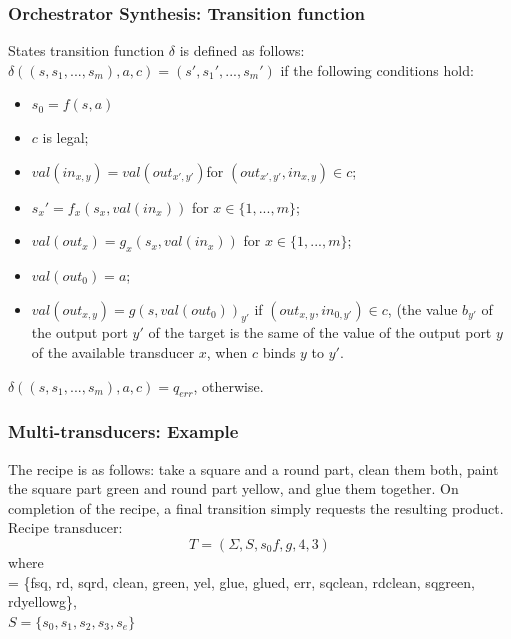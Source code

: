 \documentclass{beamer}
\theoremstyle{definition}
\theoremstyle{plain}
\begin{document}
\begin{frame}
\frametitle{Orchestrator Synthesis: Transition function}
States transition function $\delta$ is defined as follows: \\
$\delta((s, s_{1}, . . .  , s_{m}), a, c) = (s', s_{1}', . . .  , s_{m}')$ if the following conditions hold:
\begin{itemize}
\item $s_{0} = f(s, a)$
\item $c$ is legal;
\item $val(in_{x,y}) = val(out_{x',y'})$for $(out_{x',y'}, in_{x,y}) \in c$;
\item $s_{x}' = f_{x}(s_{x}, val(in_{x})) $ for $ x \in \{1, . . . ,m\}$;
\item $ val(out_{x}) = g_{x}(s_{x}, val(in_{x})) $ for $ x \in \{1, . . . ,m\}$;
\item $val(out_{0}) = a$;
\item $val(out_{x,y}) = g(s, val(out_{0}))_{y'}$ if $(out_{x,y}, in_{0, y'}) \in c$, (the value $b_{y'}$ of the output port $y'$ of the target is the same of the value of the output port $y$ of the available transducer $x$, when $c$ binds $y$ to $y'$.
\end{itemize}
$\delta((s, s_{1}, . . .  , s_{m}), a, c) = q_{err}$, otherwise.
\end{frame}

\begin{frame}
\frametitle{Multi-transducers: Example}
The recipe is as follows: take a square and a round part, clean them both, paint the square part green and round part yellow,
and glue them together. On completion of the recipe, a final transition simply requests the resulting product. Recipe transducer:
$$T = (\Sigma, S, s_{0} f, g, 4, 3)$$
where\\
\Sigma = \{fsq, rd, sqrd, clean, green, yel, glue, glued, err, sqclean, rdclean, sqgreen, rdyellowg\},\\
$S = \{s_{0}, s_{1}, s_{2}, s_{3}, s_{e}\}$\\

\end{frame}
\end{document}

